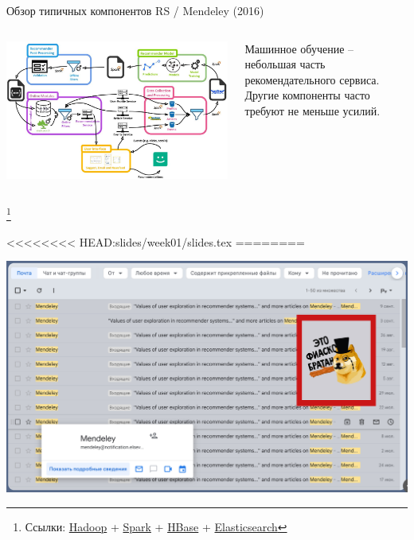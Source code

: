 \documentclass[11pt,aspectratio=169,handout]{beamer}
\begin{document}
\begin{frame}{Обзор типичных компонентов RS / Mendeley (2016) \cite{MNDL}}
\begin{columns}
\begin{column}{0.6\textwidth}
   \begin{center}
		\includegraphics[scale=0.2]{images/mendeley.jpeg}
   \end{center}
\end{column}
\begin{column}{0.35\textwidth}
    \begin{tcolorbox}[colback=info!5,colframe=info!80,title=]
    \begin{small}
    Машинное обучение -- небольшая часть рекомендательного сервиса. Другие компоненты часто требуют не меньше усилий.
    \end{small}
    \end{tcolorbox}
\end{column}
\end{columns}

\footnote{Ссылки:
\href{https://hadoop.apache.org/}{Hadoop} +
\href{https://spark.apache.org/}{Spark} +
\href{https://hbase.apache.org/}{HBase} +
\href{https://www.elastic.co/what-is/elasticsearch}{Elasticsearch}
}

\end{frame}

<<<<<<<< HEAD:slides/week01/slides.tex
========
\begin{frame}
\begin{center}
\includegraphics[scale=0.15]{images/mendeley-recs.jpeg}
\end{center}
\end{frame}
\end{document}
